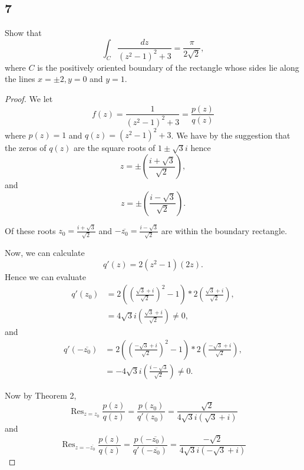 \documentclass{article}
\DeclareMathOperator*{\Res}{Res}
\begin{document}
\subsection*{7}
Show that
\[\int_C \frac{dz}{(z^2 - 1)^2 + 3} = \frac{\pi}{2\sqrt{2}},\]
where $C$ is the positively oriented boundary of the rectangle whose
sides lie along the lines $x = \pm 2, y = 0$ and $y = 1$.

\begin{proof}
    We let \[f(z) = \frac{1}{(z^2-1)^2 + 3} = \frac{p(z)}{q(z)}\]
    where $p(z) = 1$ and $q(z) = (z^2-1)^2 + 3$. We have by the
    suggestion that the zeros of $q(z)$ are the square roots of
    $1 \pm \sqrt{3}i$ hence
    \[z = \pm\left(\frac{i + \sqrt{3}}{\sqrt{2}}\right),\]
    and
    \[z = \pm\left(\frac{i - \sqrt{3}}{\sqrt{2}}\right).\]

    Of these roots $z_0 = \frac{i + \sqrt{3}}{\sqrt{2}}$ and
    $-\overline{z_0} = \frac{i - \sqrt{3}}{\sqrt{2}}$ are within
    the boundary rectangle.

    Now, we can calculate
    \begin{equation*}
        q'(z) = 2(z^2 - 1)(2z).
    \end{equation*}
    Hence we can evaluate
    \begin{align*}
        q'(z_0) & = 2(\left(\frac{\sqrt{3} + i}{\sqrt{2}}\right)^2 -1)*2\left(\frac{\sqrt{3}+i}{\sqrt{2}}\right), \\
                & = 4\sqrt{3}i\left(\frac{\sqrt{3} + i}{\sqrt{2}}\right) \neq 0,
    \end{align*}
    and
    \begin{align*}
        q'(-\overline{z_0}) & = 2(\left(\frac{-\sqrt{3} + i}{\sqrt{2}}\right)^2 -1)*2\left(\frac{-\sqrt{3}+i}{\sqrt{2}}\right), \\
                            & = -4\sqrt{3}i\left(\frac{i - \sqrt{3}}{\sqrt{2}}\right) \neq 0.
    \end{align*}

    Now by Theorem 2,
    \begin{equation*}
        \Res_{z=z_0} \frac{p(z)}{q(z)} = \frac{p(z_0)}{q'(z_0)}
        = \frac{\sqrt{2}}{4\sqrt{3}i(\sqrt{3} + i)}
    \end{equation*}
    and
    \begin{equation*}
        \Res_{z=-\overline{z_0}} \frac{p(z)}{q(z)} = \frac{p(-\overline{z_0})}{q'(-\overline{z_0})}
        = \frac{-\sqrt{2}}{4\sqrt{3}i(-\sqrt{3} + i)}
    \end{equation*}


\end{proof}
\end{document}
